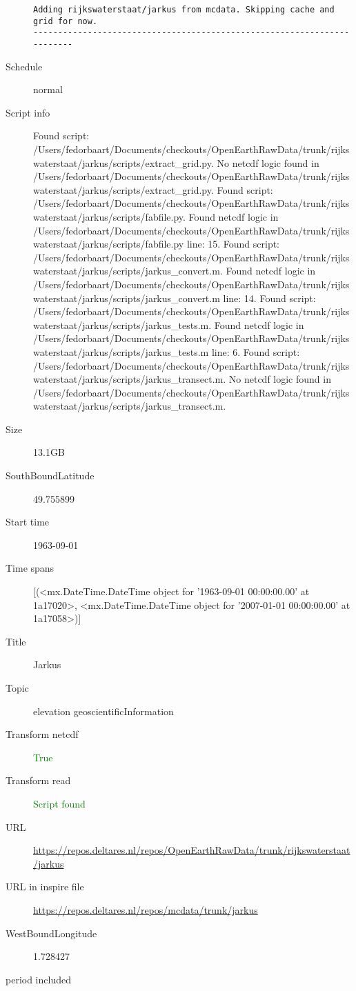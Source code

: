 \documentclass[9]{report}
\begin{document}
\begin{description}
\begin{verbatim}
Adding rijkswaterstaat/jarkus from mcdata. Skipping cache and grid for now.
------------------------------------------------------------------------

\end{verbatim}
  \item[Schedule] normal
  \item[Script info] Found script: /Users/fedorbaart/Documents/checkouts/OpenEarthRawData/trunk/rijkswaterstaat/jarkus/scripts/extract\_grid.py.
No netcdf logic found in /Users/fedorbaart/Documents/checkouts/OpenEarthRawData/trunk/rijkswaterstaat/jarkus/scripts/extract\_grid.py.
Found script: /Users/fedorbaart/Documents/checkouts/OpenEarthRawData/trunk/rijkswaterstaat/jarkus/scripts/fabfile.py.
Found netcdf logic in /Users/fedorbaart/Documents/checkouts/OpenEarthRawData/trunk/rijkswaterstaat/jarkus/scripts/fabfile.py line: 15.
Found script: /Users/fedorbaart/Documents/checkouts/OpenEarthRawData/trunk/rijkswaterstaat/jarkus/scripts/jarkus\_convert.m.
Found netcdf logic in /Users/fedorbaart/Documents/checkouts/OpenEarthRawData/trunk/rijkswaterstaat/jarkus/scripts/jarkus\_convert.m line: 14.
Found script: /Users/fedorbaart/Documents/checkouts/OpenEarthRawData/trunk/rijkswaterstaat/jarkus/scripts/jarkus\_tests.m.
Found netcdf logic in /Users/fedorbaart/Documents/checkouts/OpenEarthRawData/trunk/rijkswaterstaat/jarkus/scripts/jarkus\_tests.m line: 6.
Found script: /Users/fedorbaart/Documents/checkouts/OpenEarthRawData/trunk/rijkswaterstaat/jarkus/scripts/jarkus\_transect.m.
No netcdf logic found in /Users/fedorbaart/Documents/checkouts/OpenEarthRawData/trunk/rijkswaterstaat/jarkus/scripts/jarkus\_transect.m.
  \item[Size] 13.1GB
  \item[SouthBoundLatitude] 49.755899
  \item[Start time] 1963-09-01
  \item[Time spans] [(<mx.DateTime.DateTime object for '1963-09-01 00:00:00.00' at 1a17020>, <mx.DateTime.DateTime object for '2007-01-01 00:00:00.00' at 1a17058>)]
  \item[Title]  Jarkus 
  \item[Topic] elevation geoscientificInformation
  \item[Transform netcdf] \textcolor{green}{True}
  \item[Transform read] \textcolor{green}{Script found}
  \item[URL] \href{https://repos.deltares.nl/repos/OpenEarthRawData/trunk/rijkswaterstaat/jarkus}{https://repos.deltares.nl/repos/OpenEarthRawData/trunk/rijkswaterstaat/jarkus}
  \item[URL in inspire file] \href{https://repos.deltares.nl/repos/mcdata/trunk/jarkus}{https://repos.deltares.nl/repos/mcdata/trunk/jarkus}
  \item[WestBoundLongitude] 1.728427
  \item[period included] 
\end{description}
\end{document}
